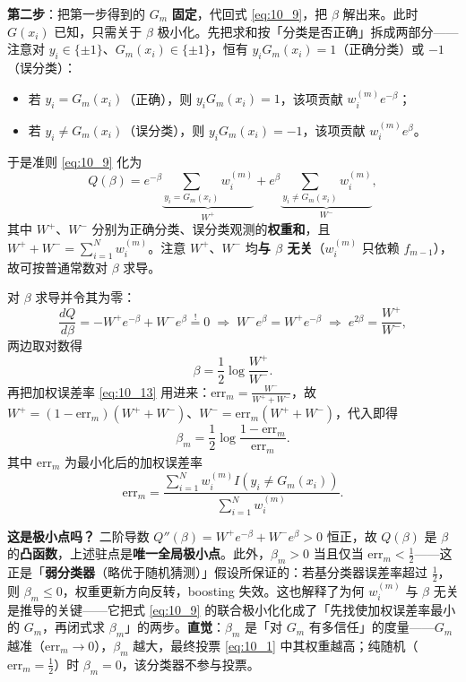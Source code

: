 \textbf{第二步}：把第一步得到的 $G_m$ \textbf{固定}，代回式 \eqref{eq:10_9}，把 $\beta$ 解出来。此时 $G(x_i)$ 已知，只需关于 $\beta$ 极小化。先把求和按「分类是否正确」拆成两部分——注意对 $y_i \in \{\pm 1\}$、$G_m(x_i) \in \{\pm 1\}$，恒有 $y_i G_m(x_i) = 1$（正确分类）或 $-1$（误分类）：
\begin{itemize}
    \item 若 $y_i = G_m(x_i)$（正确），则 $y_i G_m(x_i) = 1$，该项贡献 $w_i^{(m)} e^{-\beta}$；
    \item 若 $y_i \neq G_m(x_i)$（误分类），则 $y_i G_m(x_i) = -1$，该项贡献 $w_i^{(m)} e^{\beta}$。
\end{itemize}
于是准则 \eqref{eq:10_9} 化为
\[
    Q(\beta) = e^{-\beta}\underbrace{\sum_{y_i = G_m(x_i)} w_i^{(m)}}_{W^+} + e^{\beta}\underbrace{\sum_{y_i \neq G_m(x_i)} w_i^{(m)}}_{W^-},
\]
其中 $W^+$、$W^-$ 分别为正确分类、误分类观测的\textbf{权重和}，且 $W^+ + W^- = \sum_{i=1}^{N} w_i^{(m)}$。注意 $W^+$、$W^-$ 均\textbf{与 $\beta$ 无关}（$w_i^{(m)}$ 只依赖 $f_{m-1}$），故可按普通常数对 $\beta$ 求导。

对 $\beta$ 求导并令其为零：
\[
    \frac{dQ}{d\beta} = -W^+ e^{-\beta} + W^- e^{\beta} \overset{!}{=} 0
    \;\Longrightarrow\;
    W^- e^{\beta} = W^+ e^{-\beta}
    \;\Longrightarrow\;
    e^{2\beta} = \frac{W^+}{W^-},
\]
两边取对数得
\[
    \beta = \frac{1}{2}\log\frac{W^+}{W^-}.
\]
再把加权误差率 \eqref{eq:10_13} 用进来：$\mathrm{err}_m = \frac{W^-}{W^+ + W^-}$，故 $W^+ = (1 - \mathrm{err}_m)(W^+ + W^-)$、$W^- = \mathrm{err}_m (W^+ + W^-)$，代入即得
\begin{equation}\label{eq:10_12}
    \beta_m = \frac{1}{2}\log\frac{1 - \mathrm{err}_m}{\mathrm{err}_m}.
\end{equation}
其中 $\mathrm{err}_m$ 为最小化后的加权误差率
\begin{equation}\label{eq:10_13}
    \mathrm{err}_m = \frac{\sum_{i=1}^{N} w_i^{(m)} I(y_i \neq G_m(x_i))}{\sum_{i=1}^{N} w_i^{(m)}}.
\end{equation}

\textbf{这是极小点吗？} 二阶导数 $Q''(\beta) = W^+ e^{-\beta} + W^- e^{\beta} > 0$ 恒正，故 $Q(\beta)$ 是 $\beta$ 的\textbf{凸函数}，上述驻点是\textbf{唯一全局极小点}。此外，$\beta_m > 0$ 当且仅当 $\mathrm{err}_m < \frac{1}{2}$——这正是「\textbf{弱分类器}（略优于随机猜测）」假设所保证的：若基分类器误差率超过 $\frac{1}{2}$，则 $\beta_m \le 0$，权重更新方向反转，boosting 失效。这也解释了为何 $w_i^{(m)}$ 与 $\beta$ 无关是推导的关键——它把式 \eqref{eq:10_9} 的联合极小化化成了「先找使加权误差率最小的 $G_m$，再闭式求 $\beta_m$」的两步。\textbf{直觉}：$\beta_m$ 是「对 $G_m$ 有多信任」的度量——$G_m$ 越准（$\mathrm{err}_m \to 0$），$\beta_m$ 越大，最终投票 \eqref{eq:10_1} 中其权重越高；纯随机（$\mathrm{err}_m = \frac{1}{2}$）时 $\beta_m = 0$，该分类器不参与投票。

